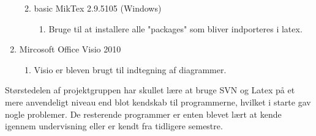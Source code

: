 \begin{enumerate}
\begin{enumerate}
\begin{enumerate}
			\end{enumerate}
		\item basic MikTex 2.9.5105 (Windows)
			\begin{enumerate}
				\item Bruge til at installere alle "packages" som bliver indporteres i latex.
			\end{enumerate}
	\end{enumerate}
	\item Mircosoft Office Visio 2010
		\begin{enumerate}
			\item Visio er bleven brugt til indtegning af diagrammer.
		\end{enumerate}
\end{enumerate}

Størstedelen af projektgruppen har skullet lære at bruge SVN og Latex på et mere anvendeligt niveau end blot kendskab til programmerne, hvilket i starte gav nogle problemer. De resterende programmer er enten blevet lært at kende igennem undervisning eller er kendt fra tidligere semestre. 